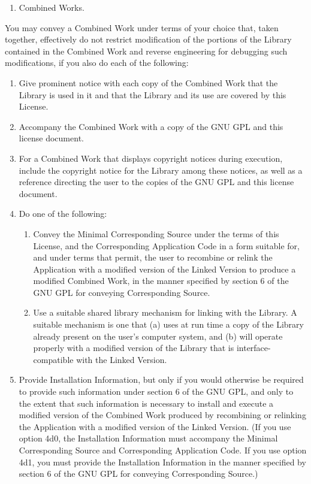 \begin{enumerate}
\def\labelenumi{\arabic{enumi}.}
\setcounter{enumi}{3}
\tightlist
\item
  Combined Works.
\end{enumerate}

You may convey a Combined Work under terms of your choice that, taken
together, effectively do not restrict modification of the portions of
the Library contained in the Combined Work and reverse engineering for
debugging such modifications, if you also do each of the following:

\begin{enumerate}
\def\labelenumi{\alph{enumi}.}
\item
  Give prominent notice with each copy of the Combined Work that the
  Library is used in it and that the Library and its use are covered by
  this License.
\item
  Accompany the Combined Work with a copy of the GNU GPL and this
  license document.
\item
  For a Combined Work that displays copyright notices during execution,
  include the copyright notice for the Library among these notices, as
  well as a reference directing the user to the copies of the GNU GPL
  and this license document.
\item
  Do one of the following:

  \begin{enumerate}
  \def\labelenumii{\arabic{enumii}.}
  \setcounter{enumii}{-1}
  \item
    Convey the Minimal Corresponding Source under the terms of this
    License, and the Corresponding Application Code in a form suitable
    for, and under terms that permit, the user to recombine or relink
    the Application with a modified version of the Linked Version to
    produce a modified Combined Work, in the manner specified by section
    6 of the GNU GPL for conveying Corresponding Source.
  \item
    Use a suitable shared library mechanism for linking with the
    Library. A suitable mechanism is one that (a) uses at run time a
    copy of the Library already present on the user's computer system,
    and (b) will operate properly with a modified version of the Library
    that is interface-compatible with the Linked Version.
  \end{enumerate}
\item
  Provide Installation Information, but only if you would otherwise be
  required to provide such information under section 6 of the GNU GPL,
  and only to the extent that such information is necessary to install
  and execute a modified version of the Combined Work produced by
  recombining or relinking the Application with a modified version of
  the Linked Version. (If you use option 4d0, the Installation
  Information must accompany the Minimal Corresponding Source and
  Corresponding Application Code. If you use option 4d1, you must
  provide the Installation Information in the manner specified by
  section 6 of the GNU GPL for conveying Corresponding Source.)
\end{enumerate}

